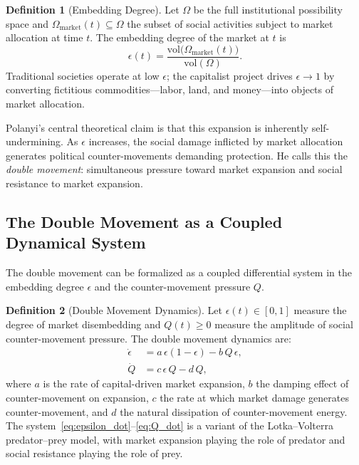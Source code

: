 \documentclass[12pt,a4paper]{article}
\theoremstyle{definition}
\newtheorem{definition}{Definition}[section]
\theoremstyle{remark}
\begin{document}
\begin{definition}[Embedding Degree]
Let $\Omega$ be the full institutional possibility space and $\Omega_{\mathrm{market}}(t) \subseteq \Omega$ the subset of social activities subject to market allocation at time $t$. The embedding degree of the market at $t$ is
\begin{equation}
  \epsilon(t) = \frac{\mathrm{vol}\bigl(\Omega_{\mathrm{market}}(t)\bigr)}{\mathrm{vol}(\Omega)}.
\end{equation}
Traditional societies operate at low $\epsilon$; the capitalist project drives $\epsilon \to 1$ by converting fictitious commodities---labor, land, and money---into objects of market allocation.
\end{definition}

Polanyi's central theoretical claim is that this expansion is inherently self-undermining. As $\epsilon$ increases, the social damage inflicted by market allocation generates political counter-movements demanding protection. He calls this the \emph{double movement}: simultaneous pressure toward market expansion and social resistance to market expansion.

\subsection{The Double Movement as a Coupled Dynamical System}

The double movement can be formalized as a coupled differential system in the embedding degree $\epsilon$ and the counter-movement pressure $Q$.

\begin{definition}[Double Movement Dynamics]
\label{def:double_movement}
Let $\epsilon(t) \in [0,1]$ measure the degree of market disembedding and $Q(t) \geq 0$ measure the amplitude of social counter-movement pressure. The double movement dynamics are:
\begin{align}
  \label{eq:epsilon_dot}
  \dot{\epsilon} &= a\,\epsilon(1-\epsilon) - b\,Q\,\epsilon, \\
  \label{eq:Q_dot}
  \dot{Q} &= c\,\epsilon\,Q - d\,Q,
\end{align}
where $a$ is the rate of capital-driven market expansion, $b$ the damping effect of counter-movement on expansion, $c$ the rate at which market damage generates counter-movement, and $d$ the natural dissipation of counter-movement energy. The system~\eqref{eq:epsilon_dot}--\eqref{eq:Q_dot} is a variant of the Lotka--Volterra predator--prey model, with market expansion playing the role of predator and social resistance playing the role of prey.
\end{definition}
\end{document}
